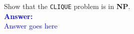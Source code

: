 \item{}
Show that the {\tt CLIQUE} problem is in {\bf NP}.\\[12pt]
\ifanswers
\textcolor{blue}{
\textbf{Answer:}\\[6pt]
Answer goes here
}
\newpage
\fi
